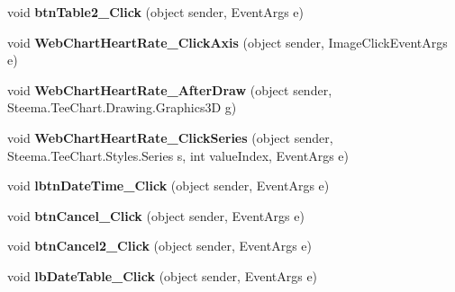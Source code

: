 \begin{DoxyCompactItemize}
\item 
\hypertarget{classusertrackothers__heartrate_a3935a3f77ce009d2231e1370ed75f52e}{void {\bfseries btn\-Table2\-\_\-\-Click} (object sender, Event\-Args e)}\label{classusertrackothers__heartrate_a3935a3f77ce009d2231e1370ed75f52e}

\item 
\hypertarget{classusertrackothers__heartrate_a6276b452d71e6dfa8e3032001cc0671d}{void {\bfseries Web\-Chart\-Heart\-Rate\-\_\-\-Click\-Axis} (object sender, Image\-Click\-Event\-Args e)}\label{classusertrackothers__heartrate_a6276b452d71e6dfa8e3032001cc0671d}

\item 
\hypertarget{classusertrackothers__heartrate_a5d550e1fa21b0a580249005cbe9c452a}{void {\bfseries Web\-Chart\-Heart\-Rate\-\_\-\-After\-Draw} (object sender, Steema.\-Tee\-Chart.\-Drawing.\-Graphics3\-D g)}\label{classusertrackothers__heartrate_a5d550e1fa21b0a580249005cbe9c452a}

\item 
\hypertarget{classusertrackothers__heartrate_a8df77bcc00fb056b96fd3763ea2ac225}{void {\bfseries Web\-Chart\-Heart\-Rate\-\_\-\-Click\-Series} (object sender, Steema.\-Tee\-Chart.\-Styles.\-Series s, int value\-Index, Event\-Args e)}\label{classusertrackothers__heartrate_a8df77bcc00fb056b96fd3763ea2ac225}

\item 
\hypertarget{classusertrackothers__heartrate_a2efe20fdc0555921a1b04153d9846935}{void {\bfseries lbtn\-Date\-Time\-\_\-\-Click} (object sender, Event\-Args e)}\label{classusertrackothers__heartrate_a2efe20fdc0555921a1b04153d9846935}

\item 
\hypertarget{classusertrackothers__heartrate_a8fb0f6fbdcd4287544709407c73e1c8a}{void {\bfseries btn\-Cancel\-\_\-\-Click} (object sender, Event\-Args e)}\label{classusertrackothers__heartrate_a8fb0f6fbdcd4287544709407c73e1c8a}

\item 
\hypertarget{classusertrackothers__heartrate_a576070fabbe6f46ccf13bb193576ce66}{void {\bfseries btn\-Cancel2\-\_\-\-Click} (object sender, Event\-Args e)}\label{classusertrackothers__heartrate_a576070fabbe6f46ccf13bb193576ce66}

\item 
\hypertarget{classusertrackothers__heartrate_aa4062a00dc32f493ea66b77ad169d8f2}{void {\bfseries lb\-Date\-Table\-\_\-\-Click} (object sender, Event\-Args e)}\label{classusertrackothers__heartrate_aa4062a00dc32f493ea66b77ad169d8f2}

\end{DoxyCompactItemize}


